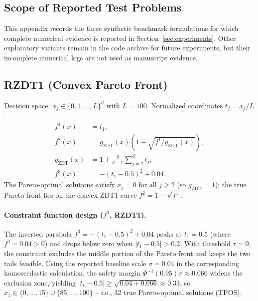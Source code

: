 \documentclass[12pt]{article}
\theoremstyle{plain}
\theoremstyle{definition}
\theoremstyle{remark}
\begin{document}
\subsection*{Scope of Reported Test Problems}\label{app:f3_design}

This appendix records the three synthetic benchmark formulations for
which complete numerical evidence is reported in
Section~\ref{sec:experiments}.  Other exploratory variants remain in
the code archive for future experiments, but their incomplete numerical
logs are not used as manuscript evidence.

\subsection{RZDT1 (Convex Pareto Front)}\label{app:rzdt1}

Decision space: $x_j \in \{0, 1, \ldots, L\}^d$ with $L = 100$.
Normalized coordinates $t_j = x_j / L$.
\begin{align*}
  f^1(x) &= t_1, \\
  f^2(x) &= g_{\mathrm{ZDT}}(x)\!\left(1 - \sqrt{f^1/g_{\mathrm{ZDT}}(x)}\right), \\
  g_{\mathrm{ZDT}}(x)   &= 1 + \frac{9}{d-1}\sum_{j=2}^{d} t_j, \\
  f^3(x) &= -(t_1 - 0.5)^2 + 0.04.
\end{align*}
The Pareto-optimal solutions satisfy $x_j=0$ for all $j\ge2$ (so $g_{\mathrm{ZDT}}=1$);
the true Pareto front lies on the convex ZDT1 curve
$f^2 = 1-\sqrt{f^1}$.

\paragraph{Constraint function design ($f^3$, RZDT1).}
The inverted parabola $f^3 = -(t_1 - 0.5)^2 + 0.04$ peaks at
$t_1 = 0.5$ (where $f^3 = 0.04 > 0$) and drops below zero when
$|t_1 - 0.5| > 0.2$.  With threshold $\tau = 0$, the constraint excludes
the middle portion of the Pareto front and keeps the two tails feasible.
Using the reported baseline scale $\sigma = 0.04$ in the corresponding
homoscedastic calculation, the safety margin
$\Phi^{-1}(0.95)\sigma \approx 0.066$ widens the exclusion zone, yielding
$|t_1-0.5| \ge \sqrt{0.04+0.066} \approx 0.33$, so
$x_1 \in \{0,\ldots,15\} \cup \{85,\ldots,100\}$ -- i.e., 32 true
Pareto-optimal solutions (TPOS).
\end{document}
